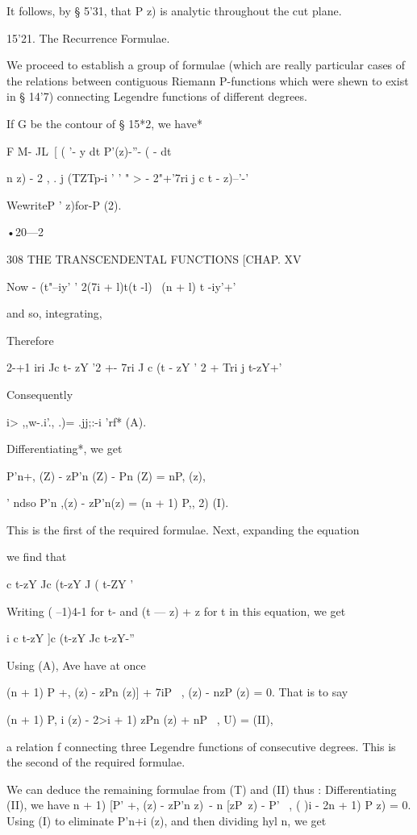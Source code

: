 {It follows, by § 5'31, that P z) is analytic throughout the cut plane.

15'21. The Recurrence Formulae.

We proceed to establish a group of formulae (which are really
particular cases of the relations between contiguous Riemann
P-functions which were shewn to exist in § 14'7) connecting Legendre
functions of different degrees.

If G be the contour of § 15*2, we have*

F M- JL\ [ ( '- y dt P'(z)-''- ( - dt

 n z) - 2 , . j (TZTp-i ' ' " > - 2"+'7ri j c t - z)--'-'



WewriteP ' z)for-P (2).



•20—2



308 THE TRANSCENDENTAL FUNCTIONS [CHAP. XV

Now - (t"--iy' ' 2(7i + l)t(t -l) \ (n + l) t -iy'+'

and so, integrating,

Therefore

2-+1 iri Jc t- zY '2 +- 7ri J c (t - zY ' 2 + Tri j t-zY+'

Consequently

i> ,,w-.i'., .)= .jj;:-i 'rf* (A).

Differentiating*, we get

P'n+, (Z) - zP'n (Z) - Pn (Z) = nP, (z),

' ndso P'n ,(z) - zP'n(z) = (n + 1) P,, 2) (I).

This is the first of the required formulae. Next, expanding the
equation

we find that

c t-zY Jc (t-zY J ( t-ZY '

Writing ( --1)4-1 for t- and (t — z) + z for t in this equation, we
get

 i c t-zY ]c (t-zY Jc t-zY-''

Using (A), Ave have at once

(n + 1) P +, (z) - zPn (z)] + 7iP \ , (z) - nzP (z) = 0. That is to
say

(n + 1) P, i (z) - 2>i + 1) zPn (z) + nP \ , U) = (II),

a relation f connecting three Legendre functions of consecutive
degrees. This is the second of the required formulae.

We can deduce the remaining formulae from (T) and (II) thus :
Differentiating (II), we have n + 1) [P' +, (z) - zP'n z)\ - n [zP\ z)
- P' \ , ( )i - 2n + 1) P z) = 0. Using (I) to eliminate P'n+i (z),
and then dividing hyl n, we get

}
